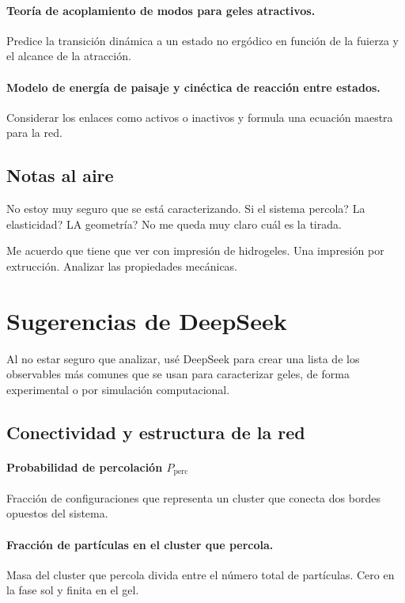 \documentclass[../main.tex]{subfiles}
\begin{document}
\paragraph{Teoría de acoplamiento de modos para geles atractivos.}
Predice la transición dinámica a un estado no ergódico en función de la fuierza y el alcance de la atracción.

\paragraph{Modelo de energía de paisaje y cinéctica de reacción entre estados.}
Considerar los enlaces como activos o inactivos y formula una ecuación maestra para la red.

\subsection{Notas al aire}

No estoy muy seguro que se está caracterizando.
Si el sistema percola?
La elasticidad?
LA geometría?
No me queda muy claro cuál es la tirada.

Me acuerdo que tiene que ver con impresión de hidrogeles.
Una impresión por extrucción.
Analizar las propiedades mecánicas.

\section{Sugerencias de DeepSeek}

Al no estar seguro que analizar, usé DeepSeek para crear una lista de los observables más comunes que se usan para caracterizar geles, de forma experimental o por simulación computacional.

\subsection{Conectividad y estructura de la red}

\paragraph{Probabilidad de percolación \(P_{\mathrm{perc}}\)}
Fracción de configuraciones que representa un cluster que conecta dos bordes opuestos del sistema.

\paragraph{Fracción de partículas en el cluster que percola.}
Masa del cluster que percola divida entre el número total de partículas.
Cero en la fase sol y finita en el gel.
\end{document}
